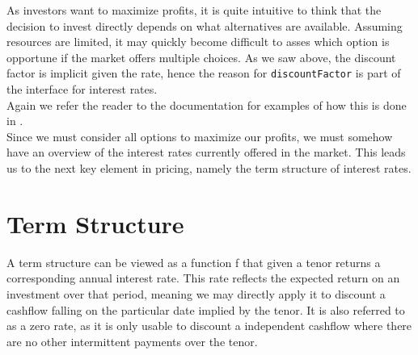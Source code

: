 As investors want to maximize profits, it is quite intuitive to think that
the decision to invest directly depends on what alternatives are available.
Assuming resources are limited, it may quickly become difficult to asses which
option is opportune if the market offers multiple choices. As we saw above,
the discount factor is implicit given the rate, hence the reason for
\texttt{discountFactor} is part of the interface for interest rates.\\
Again we refer the reader to the documentation\cite{hqldoc} for examples of
how this is done in \hql.\\

Since we must consider all options to maximize our profits, we must somehow have an
overview of the interest rates currently offered in the market. This leads us to the
next key element in pricing, namely the term structure of interest rates.

\section{Term Structure}\label{sec:ts}

A term structure can be viewed as a function f that given a tenor returns 
a corresponding annual interest rate. This rate reflects the expected return 
on an investment over that period, meaning we may directly apply it to 
discount a cashflow falling on the particular date implied by the tenor.
It is also referred to as a zero rate, as it is only usable to discount 
a independent cashflow where there are no other intermittent payments over
the tenor.


